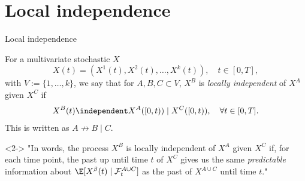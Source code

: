 \documentclass{beamer}\usepackage{listings}
\begin{document}
\section{Local independence}
\label{sec:orgcc6af39}
\begin{frame}[label={sec:orga2665f4}]{Local independence}
\pause
\begin{definition}[Informal]
For a multivariate stochastic $X$
\begin{equation*}
  X(t) = (X^1(t), X^2(t), \dots, X^k(t)), \quad t \in [0, T], 
\end{equation*}
with $V:=\{1, \dots, k\}$, we say that for $A, B, C \subset V$, $X^B$ is \textit{locally
  independent} of $X^A$ given $X^C$ if
\begin{equation*}
  X^B(t) \independent X^A([0,t)) \mid X^C([0,t)), \quad \forall t \in [0, T].
\end{equation*}
This is written as $  A \not \rightarrow B \mid C$.

\pause
\end{definition}
\begin{block}<2->{}
"In words, the process $X^B$ is locally independent of $X^A$ given $X^C$ if, for each time point,
the past up until time $t$ of $X^C$ gives us the same \textit{predictable} information about
$\E[X^{\beta}(t) \mid \mathcal{F}_t^{A\cup C}]$ as the past of $X^{A \cup C}$ until time $t$." \citep{mogensen2020markov}
\end{block}
\end{frame}
\end{document}
